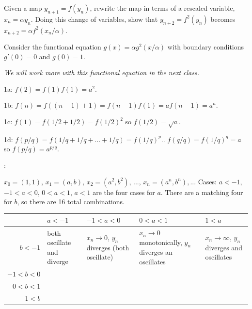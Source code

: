 \documentclass[12pt,letterpaper,noanswers]{exam}
\begin{document}
\begin{questions}
Given a map $y_{n+1} = f(y_n)$, rewrite the map in terms of a rescaled variable, $x_n = \alpha y_n$.  Doing this change of variables, show that $y_{n+2} = f^2(y_n)$ becomes $x_{n+2} = \alpha f^2(x_n/\alpha)$.

\question Consider the functional equation $g(x) = \alpha g^2(x/\alpha)$ with boundary conditions $g'(0) = 0$ and $g(0) = 1$.

\emph{We will work more with this functional equation in the next class.}


\end{questions}

\eject

\noindent
1a: $f(2) = f(1)f(1) = a^2$.  

\noindent
1b: $f(n) = f((n-1)+1) = f(n-1)f(1) = af(n-1) = a^n$.  

\noindent
1c: $f(1) = f(1/2+1/2) = f(1/2)^2$ so $f(1/2) = \sqrt{a}$. 

\noindent
1d: $f(p/q) = f(1/q+1/q+...+1/q)= f(1/q)^p.$. $f(q/q) = f(1/q)^q = a$ so $f(p/q) = a^{p/q}$.

:

$x_0=(1,1)$, $x_1 = (a,b)$, $x_2 = (a^2,b^2)$, ..., $x_n = (a^n,b^n),$...
    Cases: $a<-1$, $-1<a<0$, $0<a<1$, $a<1$ are the four cases for $a$.  There are a matching four for $b$, so there are 16 total combinations.
    
    \begin{tabular}{|r | p{3cm}| p{3cm} |p{3cm} |p{3cm}|}
    \hline
    & $a<-1$ & $-1<a<0$ & $0<a<1$ & $1<a$ \\
    \hline
    $b<-1$ & both oscillate and diverge & $x_n\rightarrow 0$, $y_n$ diverges (both oscillate)& $x_n\rightarrow 0$ monotonically, $y_n$ diverges an oscillates & $x_n \rightarrow \infty$, $y_n$ diverges and oscillates\\
    \hline
        $-1<b<0$ & & & &\\
        \hline
            $0<b<1$ & & & &\\
            \hline
                $1<b$ & & & &\\
                \hline
    \end{tabular}
    
\end{document}
